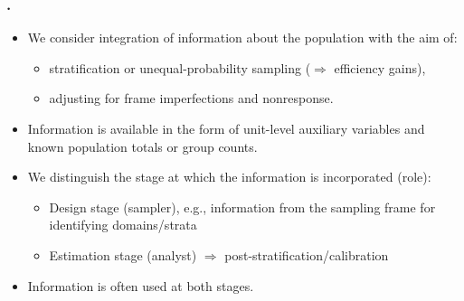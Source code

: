 \documentclass{my_eth_beamer}
\numberwithin{equation}{section}
\begin{document}
\begin{frame}
    \frametitle{\insertsectionnumber.\insertsubsectionnumber~\insertsubsection}
    \begin{itemize}
    \setlength{\itemsep}{6pt}
        \item We consider \alert{integration of information} about the
            population with the aim of:
            \vspace{0.25em}
            \begin{itemize}
            \setlength{\itemsep}{3pt}
                \item stratification or unequal-probability sampling
                    ($\Rightarrow$ efficiency gains),
                \item adjusting for frame imperfections and nonresponse.
            \end{itemize}
        \item Information is available in the form of \alert{unit-level
            auxiliary variables} and known \alert{population totals} or
            \alert{group counts}.
        \item We distinguish the \alert{stage} at which the information is
            incorporated (role):
            \vspace{0.25em}
            \begin{itemize}
            \setlength{\itemsep}{3pt}
                \item \alert{Design stage} (sampler), e.g., information from
                    the sampling frame for identifying domains/strata
                \item \alert{Estimation stage} (analyst) $\Rightarrow$
                    post-stratification/calibration
            \end{itemize}
        \item Information is often used at \alert{both} stages.
    \end{itemize}
\end{frame}
\end{document}
